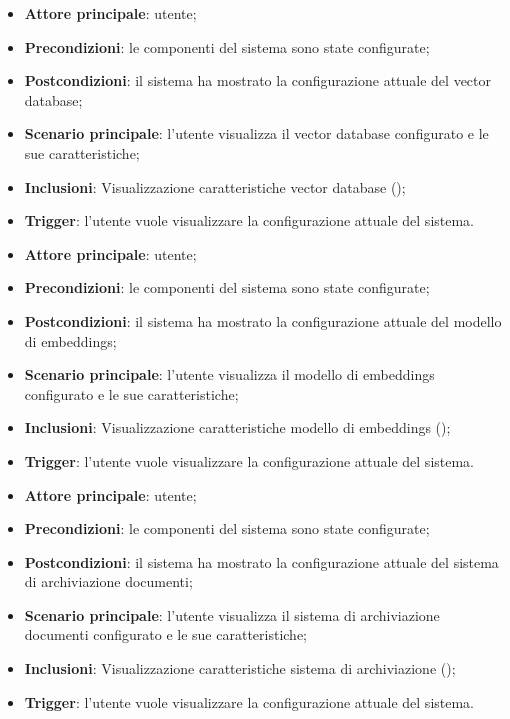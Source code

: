 \documentclass[10pt, a4paper]{article}
\begin{document}
    \begin{itemize}
        \item \textbf{Attore principale}: utente;
        \item \textbf{Precondizioni}: le componenti del sistema sono state configurate;
        \item \textbf{Postcondizioni}: il sistema ha mostrato la configurazione attuale del vector database;
        \item \textbf{Scenario principale}: l’utente visualizza il vector database configurato e le sue caratteristiche;
        \item \textbf{Inclusioni}: Visualizzazione caratteristiche vector database ();
        \item \textbf{Trigger}: l’utente vuole visualizzare la configurazione attuale del sistema.
    \end{itemize}

    \begin{itemize}
        \item \textbf{Attore principale}: utente;
        \item \textbf{Precondizioni}: le componenti del sistema sono state configurate;
        \item \textbf{Postcondizioni}: il sistema ha mostrato la configurazione attuale del modello di embeddings;
        \item \textbf{Scenario principale}: l’utente visualizza il modello di embeddings configurato e le sue caratteristiche;
        \item \textbf{Inclusioni}: Visualizzazione caratteristiche modello di embeddings ();
        \item \textbf{Trigger}: l’utente vuole visualizzare la configurazione attuale del sistema.
    \end{itemize}

    \begin{itemize}
        \item \textbf{Attore principale}: utente;
        \item \textbf{Precondizioni}: le componenti del sistema sono state configurate;
        \item \textbf{Postcondizioni}: il sistema ha mostrato la configurazione attuale del sistema di archiviazione documenti;
        \item \textbf{Scenario principale}: l’utente visualizza il sistema di archiviazione documenti configurato e le sue caratteristiche;
        \item \textbf{Inclusioni}: Visualizzazione caratteristiche sistema di archiviazione ();
        \item \textbf{Trigger}: l’utente vuole visualizzare la configurazione attuale del sistema.
    \end{itemize}
\end{document}

